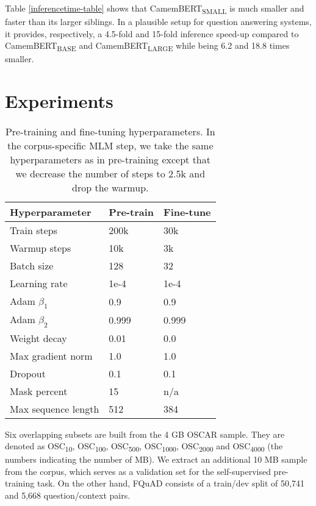 \documentclass[11pt,a4paper]{article}
\begin{document}
Table \ref{inferencetime-table} shows that CamemBERT\textsubscript{SMALL} is much smaller and faster than its larger siblings. In a plausible setup for question answering systems, it provides, respectively, a 4.5-fold and 15-fold inference speed-up compared to CamemBERT\textsubscript{BASE} and CamemBERT\textsubscript{LARGE} while being 6.2 and 18.8 times smaller.

\section{Experiments} \label{experiments}

\begin{table}
\centering
\begin{tabular}{lll}
\hline \textbf{Hyperparameter} & \textbf{Pre-train} & \textbf{Fine-tune} \\ \hline
Train steps & 200k & 30k \\
Warmup steps & 10k & 3k \\
Batch size & 128 & 32 \\
Learning rate & 1e-4 & 1e-4 \\
Adam $\beta_1$ & 0.9 & 0.9 \\
Adam $\beta_2$ & 0.999 & 0.999 \\
Weight decay & 0.01 & 0.0 \\
Max gradient norm & 1.0 & 1.0 \\
Dropout & 0.1 & 0.1 \\
Mask percent & 15 & n/a \\
Max sequence length & 512 & 384 \\
\hline
\end{tabular}
\caption{\label{hyperparameters-table} Pre-training and fine-tuning hyperparameters. In the corpus-specific MLM step, we take the same hyperparameters as in pre-training except that we decrease the number of steps to 2.5k and drop the warmup.}
\end{table}

Six overlapping subsets are built from the 4 GB OSCAR sample. They are denoted as OSC\textsubscript{10}, OSC\textsubscript{100}, OSC\textsubscript{500}, OSC\textsubscript{1000}, OSC\textsubscript{2000} and OSC\textsubscript{4000} (the numbers indicating the number of MB). We extract an additional 10 MB sample from the corpus, which serves as a validation set for the self-supervised pre-training task. On the other hand, FQuAD consists of a train/dev split of 50,741 and 5,668 question/context pairs.
\end{document}
